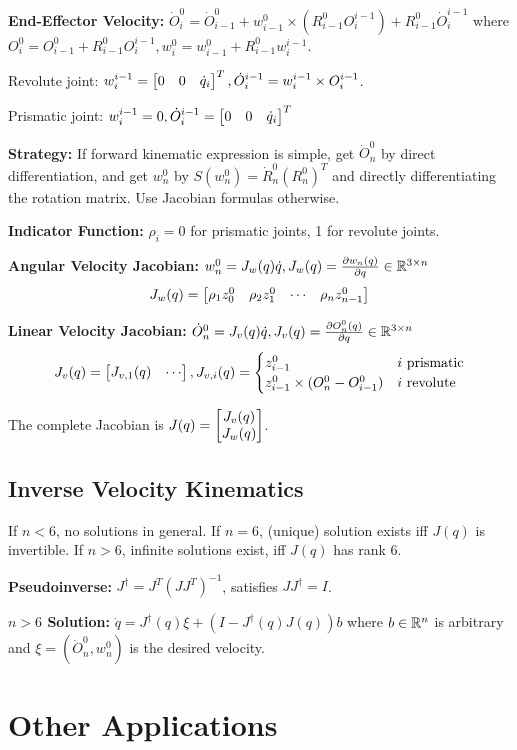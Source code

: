 \documentclass[twocolumn, 8pt]{extarticle}
\begin{document}
\textbf{End-Effector Velocity:} \(\dot O_i^0 = \dot O_{i - 1}^0 + w_{i - 1}^0 \times (R_{i - 1}^0O_i^{i - 1}) + R_{i - 1}^0\dot O_i^{i - 1}\)
where \(O_i^0 = O_{i - 1}^0 + R_{i - 1}^0O_i^{i - 1}, w_i^0 = w_{i - 1}^0 + R_{i - 1}^0w_i^{i - 1}\).

Revolute joint: \(w_i^{i - 1} = \rvec{0}{0}{\dot q_i}^T, \dot O_i^{i - 1} = w_i^{i - 1} \times O_i^{i - 1}\).

Prismatic joint: \(w_i^{i - 1} = 0, \dot O_i^{i - 1} = \rvec{0}{0}{\dot q_i}^T\)

\textbf{Strategy:} If forward kinematic expression is simple, get \(\dot O_n^0\) by direct differentiation, and get
\(w_n^0\) by \(S(w_n^0) = \dot R_n^0(R_n^0)^T\) and directly differentiating the rotation matrix. Use Jacobian formulas
otherwise.

\textbf{Indicator Function:} \(\rho _i = 0\) for prismatic joints, 1 for revolute joints.

\textbf{Angular Velocity Jacobian:} \(w_n^0 = J_w(q)\dot q, J_w(q) = \frac{\partial w_n(q)}{\partial q} \in \mathbb{R}^{3 \times n}\)
\[J_w(q) = \rvec{\rho _1 z_0^0}{\rho _2 z_1^0}{\cdots}{\rho _n z_{n - 1}^0}\]

\textbf{Linear Velocity Jacobian:} \(\dot O_n^0 = J_v(q)\dot q, J_v(q) = \frac{\partial O_n^0(q)}{\partial q} \in \mathbb{R}^{3 \times n}\)
\[J_v(q) = \rvec{J_{v,1}(q)}{\cdots}, J_{v,i}(q) = \twocond{z_{i - 1}^0}{i\text{ prismatic}}{z_{i - 1}^0 \times (O_n^0 - O_{i - 1}^0)}{i\text{ revolute}}\]

The complete Jacobian is \(J(q) = \cvec{J_v(q)}{J_w(q)}\).

\subsection{Inverse Velocity Kinematics}

If \(n < 6\), no solutions in general. If \(n = 6\), (unique) solution exists iff \(J(q)\) is invertible. If \(n > 6\),
infinite solutions exist, iff \(J(q)\) has rank 6.

\textbf{Pseudoinverse:} \(J^\dagger = J^T(JJ^T)^{-1}\), satisfies \(JJ^\dagger = I\).

\textbf{\(n > 6\) Solution:} \(\dot q = J^\dagger(q)\xi + (I - J^\dagger(q)J(q))b\) where \(b \in \mathbb{R}^n\) is
arbitrary and \(\xi = (\dot O_n^0, w_n^0)\) is the desired velocity.

\section{Other Applications}
\end{document}
